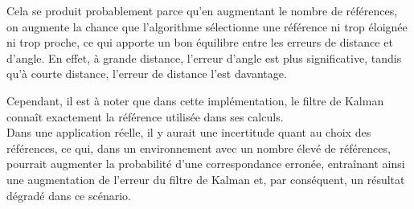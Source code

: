\documentclass[../CSC_5RO12_TA_TP2.tex]{subfiles}
\begin{document}
\noindent Cela se produit probablement parce qu'en augmentant le nombre de références, on augmente la chance que l'algorithme sélectionne une référence ni trop éloignée ni trop proche, ce qui apporte un bon équilibre entre les erreurs de distance et d'angle. En effet, à grande distance, l'erreur d'angle est plus significative, tandis qu'à courte distance, l'erreur de distance l'est davantage.
\begin{remark}
    Cependant, il est à noter que dans cette implémentation, le filtre de Kalman connaît exactement la référence utilisée dans ses calculs.\\

    \noindent Dans une application réelle, il y aurait une incertitude quant au choix des références, ce qui, dans un environnement avec un nombre élevé de références, pourrait augmenter la probabilité d'une correspondance erronée, entraînant ainsi une augmentation de l'erreur du filtre de Kalman et, par conséquent, un résultat dégradé dans ce scénario.
\end{remark}
\end{document}
